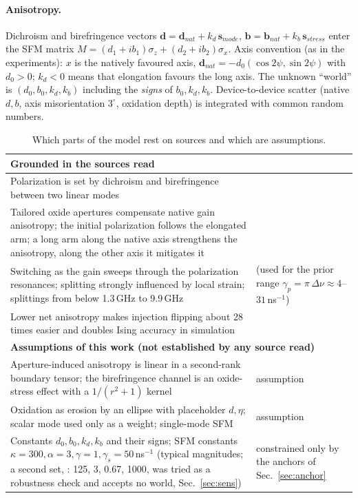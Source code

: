 \documentclass[10pt]{article}
\begin{document}
\paragraph{Anisotropy.} Dichroism and birefringence vectors $\mathbf d=\mathbf d_{nat}+k_d\,\mathbf s_{mode}$, $\mathbf b=\mathbf b_{nat}+k_b\,\mathbf s_{stress}$ enter the SFM matrix $M=(d_1+ib_1)\sigma_z+(d_2+ib_2)\sigma_x$.
Axis convention (as in the experiments): $x$ is the natively favoured axis, $\mathbf d_{nat}=-d_0(\cos2\psi,\sin2\psi)$ with $d_0>0$; $k_d<0$ means that elongation favours the long axis.
The unknown ``world'' is $(d_0,b_0,k_d,k_b)$ including the \emph{signs} of $b_0,k_d,k_b$. Device-to-device scatter (native $d,b$, axis misorientation $3^\circ$, oxidation depth) is integrated with common random numbers.
\begin{table}[H]\centering\small\begin{tabular}{p{}p{}}\toprule
\multicolumn{2}{l}{\textbf{Grounded in the sources read}}\\\midrule
Polarization is set by dichroism and birefringence between two linear modes & \cite{sanmiguel1995,martinregalado1997}\\
Tailored oxide apertures compensate native gain anisotropy; the initial polarization follows the elongated arm; a long arm along the native axis strengthens the anisotropy, along the other axis it mitigates it & \cite{yuan2025jlt,yuan2025mesa,yuan2025apl126}\\
Switching as the gain sweeps through the polarization resonances; splitting strongly influenced by local strain; splittings from below 1.3\,GHz to 9.9\,GHz & \cite{choquette1995} (used for the prior range $\gamma_p=\pi\,\Delta\nu\approx4$--$31$\,ns$^{-1}$)\\
Lower net anisotropy makes injection flipping about 28 times easier and doubles Ising accuracy in simulation & \cite{chen2026meta}\\\midrule
\multicolumn{2}{l}{\textbf{Assumptions of this work (not established by any source read)}}\\\midrule
Aperture-induced anisotropy is linear in a second-rank boundary tensor; the birefringence channel is an oxide-stress effect with a $1/(r^2+1)$ kernel & assumption\\
Oxidation as erosion by an ellipse with placeholder $d,\eta$; scalar mode used only as a weight; single-mode SFM & assumption\\
Constants $d_0,b_0,k_d,k_b$ and their signs; SFM constants $\kappa=300,\alpha=3,\gamma=1,\gamma_s=50$\,ns$^{-1}$ (typical magnitudes; a second set, \cite{chen2026meta}: 125, 3, 0.67, 1000, was tried as a robustness check and accepts no world, Sec.~\ref{sec:sens}) & constrained only by the anchors of Sec.~\ref{sec:anchor}\\\bottomrule\end{tabular}
\caption{Which parts of the model rest on sources and which are assumptions.}\end{table}
\end{document}
